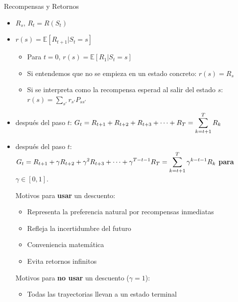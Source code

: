 \documentclass[10pt, envcountsect, handout, aspectratio=1610, hyperref={hypertexnames=true}]{beamer}
\begin{document}
\begin{frame}{Recompensas y Retornos}
\begin{itemize}
\item {} $R_s$, $R_{t}=R(S_t)$
\item {} $r(s)=\mathbb{E}[R_{t+1}|S_t=s]$
	\begin{itemize}
    	\item Para $t=0$, $r(s)=\mathbb{E}[R_{1}|S_t=s]$
    	\item Si entendemos que no se empieza en un estado concreto: $r(s)=R_s$
    	\item Si se interpreta como la recompensa esperad al salir del estado $s$: $r(s)=\sum_{s'} r_{s'} P_{ss'}$
	\end{itemize}

\item {} después del paso $t$: $\displaystyle G_t=R_{t+1}+R_{t+2}+R_{t+3}+\cdots+R_T = \sum_{k=t+1}^{T} R_{k}$

\item {} después del paso $t$: $\displaystyle G_t=R_{t+1} + \gamma R_{t+2} + \gamma^2 R_{t+3}+\cdots+ \gamma^{T-t-1} R_T=\sum_{k=t+1}^{T} \gamma^{k-t-1} R_{k}$ \textbf{para} \( \gamma \in[0,1] \).


\faForward{}  Motivos para \textbf{usar} un descuento:
    \begin{itemize}
        \item Representa la preferencia natural por recompensas inmediatas
        \item Refleja la incertidumbre del futuro
        \item Conveniencia matemática
        \item Evita retornos infinitos
    \end{itemize}

\faForward{}  Motivos para \textbf{no usar} un descuento ($\gamma = 1$):
	\begin{itemize}
	\item  Todas las trayectorias llevan a un estado terminal
	\end{itemize}
\end{itemize}
\end{frame}
\end{document}
